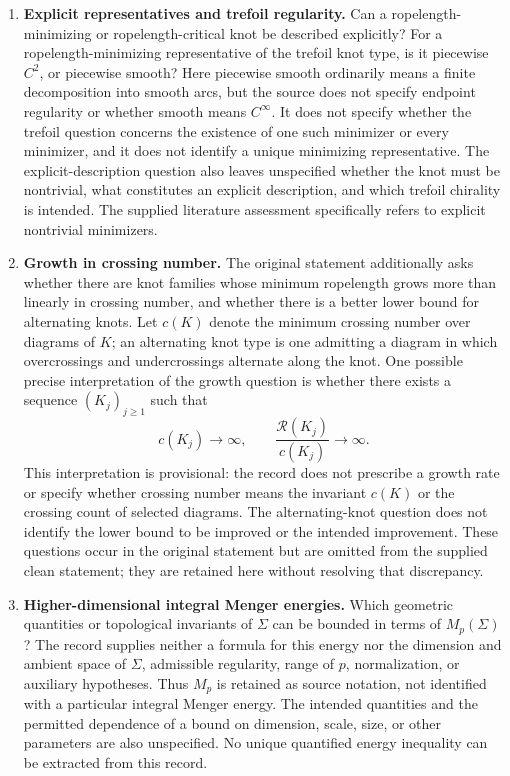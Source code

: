 \documentclass[11pt]{article}
\begin{document}
\begin{enumerate}
\item \textbf{Explicit representatives and trefoil regularity.} Can a ropelength-minimizing or ropelength-critical knot be described explicitly? For a ropelength-minimizing representative of the trefoil knot type, is it piecewise \(C^2\), or piecewise smooth? Here piecewise smooth ordinarily means a finite decomposition into smooth arcs, but the source does not specify endpoint regularity or whether smooth means \(C^\infty\). It does not specify whether the trefoil question concerns the existence of one such minimizer or every minimizer, and it does not identify a unique minimizing representative. The explicit-description question also leaves unspecified whether the knot must be nontrivial, what constitutes an explicit description, and which trefoil chirality is intended. The supplied literature assessment specifically refers to explicit nontrivial minimizers.

\item \textbf{Growth in crossing number.} The original statement additionally asks whether there are knot families whose minimum ropelength grows more than linearly in crossing number, and whether there is a better lower bound for alternating knots. Let \(c(K)\) denote the minimum crossing number over diagrams of \(K\); an alternating knot type is one admitting a diagram in which overcrossings and undercrossings alternate along the knot. One possible precise interpretation of the growth question is whether there exists a sequence \((K_j)_{j\geq1}\) such that
\[
c(K_j)\longrightarrow\infty,
\qquad
\frac{\mathcal R(K_j)}{c(K_j)}\longrightarrow\infty.
\]
This interpretation is provisional: the record does not prescribe a growth rate or specify whether crossing number means the invariant \(c(K)\) or the crossing count of selected diagrams. The alternating-knot question does not identify the lower bound to be improved or the intended improvement. These questions occur in the original statement but are omitted from the supplied clean statement; they are retained here without resolving that discrepancy.

\item \textbf{Higher-dimensional integral Menger energies.} Which geometric quantities or topological invariants of \(\Sigma\) can be bounded in terms of \(M_p(\Sigma)\)? The record supplies neither a formula for this energy nor the dimension and ambient space of \(\Sigma\), admissible regularity, range of \(p\), normalization, or auxiliary hypotheses. Thus \(M_p\) is retained as source notation, not identified with a particular integral Menger energy. The intended quantities and the permitted dependence of a bound on dimension, scale, size, or other parameters are also unspecified. No unique quantified energy inequality can be extracted from this record.


\end{enumerate}
\end{document}
